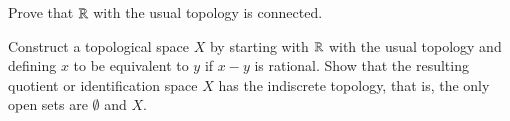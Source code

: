 \documentclass[12pt]{exam}
\theoremstyle{definition}
\newcommand{\R}{\mathcal{R}}
\def\R{{ \Bbb R}}
\begin{document}
\begin{questions}
\question

Prove that $\R$ with the usual topology  is connected.







\question

Construct a topological space $X$ by starting with $\R$ with the
usual topology and defining $x$ to be equivalent to $y$ if $x-y$ is
rational. Show that the resulting quotient or identification space
$X$ has the indiscrete topology, that is, the only open sets are
$\emptyset $ and $X$.








\end{questions}
\end{document}
